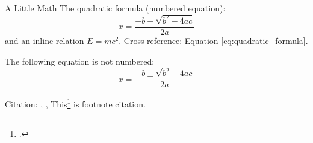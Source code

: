 \begin{frame}{A Little Math}
  The quadratic formula (numbered equation):
  \begin{equation}
    x = \frac{-b \pm \sqrt{b^2 - 4ac}}{2a}
  \end{equation} \label{eq:quadratic_formula}
  and an inline relation $E = mc^2$. Cross reference: Equation \ref{eq:quadratic_formula}.
  
  The following equation is not numbered:
  \begin{equation*}
    x = \frac{-b \pm \sqrt{b^2 - 4ac}}{2a}
  \end{equation*}

  Citation: \textcite{hawking1975particle}, \parencite{einstein1935can}, This\footcite{einstein1935can} is footnote citation.
\end{frame}